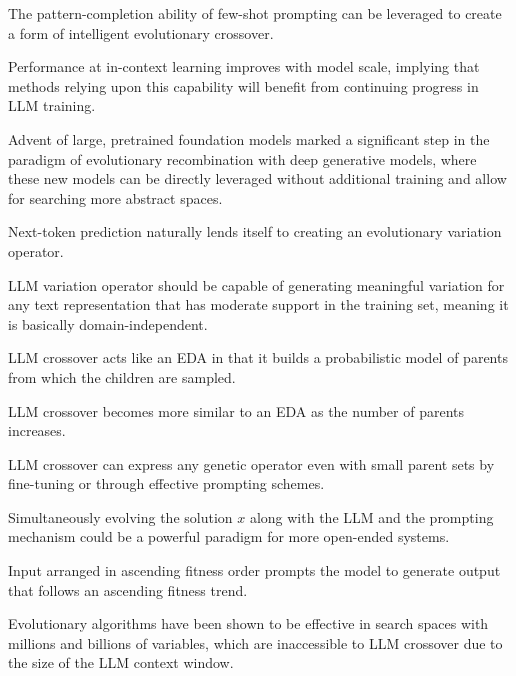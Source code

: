 The pattern-completion ability of few-shot prompting can be leveraged to create a form of intelligent evolutionary crossover. \cite{meyerson2024languagemodelcrossovervariation}

Performance at in-context learning improves with model scale, implying that methods relying upon this capability will benefit from continuing progress in LLM training. \cite{meyerson2024languagemodelcrossovervariation}

Advent of large, pretrained foundation models marked a significant step in the paradigm of evolutionary recombination with deep generative models, where these new models can be directly leveraged without additional training and allow for searching more abstract spaces. \cite{meyerson2024languagemodelcrossovervariation}

Next-token prediction naturally lends itself to creating an evolutionary variation operator. \cite{meyerson2024languagemodelcrossovervariation}

LLM variation operator should be capable of generating meaningful variation for any text representation that has moderate support in the training set, meaning it is basically domain-independent. \cite{meyerson2024languagemodelcrossovervariation}

LLM crossover acts like an EDA in that it builds a probabilistic model of parents from which the children are sampled. \cite{meyerson2024languagemodelcrossovervariation}

LLM crossover becomes more similar to an EDA as the number of parents increases. \cite{meyerson2024languagemodelcrossovervariation}

LLM crossover can express any genetic operator even with small parent sets by fine-tuning or through effective prompting schemes. \cite{meyerson2024languagemodelcrossovervariation}

Simultaneously evolving the solution $\mathit{x}$ along with the LLM and the prompting mechanism could be a powerful paradigm for more open-ended systems. \cite{meyerson2024languagemodelcrossovervariation}

Input arranged in ascending fitness order prompts the model to generate output that follows an ascending fitness trend. \cite{meyerson2024languagemodelcrossovervariation}

Evolutionary algorithms have been shown to be effective in search spaces with millions and billions of variables, which are inaccessible to LLM crossover due to the size of the LLM context window. \cite{meyerson2024languagemodelcrossovervariation}

